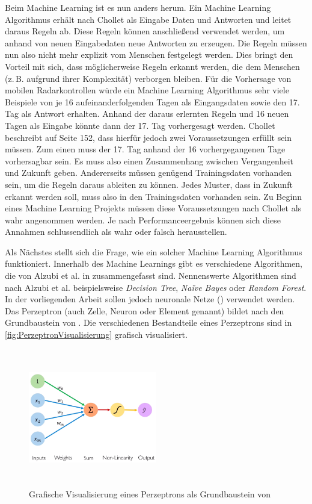 Beim Machine Learning ist es nun anders herum.
Ein Machine Learning Algorithmus erhält nach Chollet als Eingabe Daten und Antworten und leitet daraus Regeln ab.
Diese Regeln können anschließend verwendet werden, um anhand von neuen Eingabedaten neue Antworten zu erzeugen.
Die Regeln müssen nun also nicht mehr explizit vom Menschen festgelegt werden.
Dies bringt den Vorteil mit sich, dass möglicherweise Regeln erkannt werden, die dem Menschen (z.\,B. aufgrund ihrer Komplexität) verborgen bleiben.
Für die Vorhersage von mobilen Radarkontrollen würde ein Machine Learning Algorithmus sehr viele Beispiele von je 16 aufeinanderfolgenden Tagen als Eingangsdaten sowie den 17. Tag als Antwort erhalten.
Anhand der daraus erlernten Regeln und 16 neuen Tagen als Eingabe könnte dann der 17. Tag vorhergesagt werden.
Chollet beschreibt auf Seite 152, dass hierfür jedoch zwei Voraussetzungen erfüllt sein müssen.
Zum einen muss der 17. Tag anhand der 16 vorhergegangenen Tage vorhersagbar sein.
Es muss also einen Zusammenhang zwischen Vergangenheit und Zukunft geben.
Andererseits müssen genügend Trainingsdaten vorhanden sein, um die Regeln daraus ableiten zu können.
Jedes Muster, dass in Zukunft erkannt werden soll, muss also in den Trainingsdaten vorhanden sein.
Zu Beginn eines Machine Learning Projekts müssen diese Voraussetzungen nach Chollet als wahr angenommen werden.
Je nach Performanceergebnis können sich diese Annahmen schlussendlich als wahr oder falsch herausstellen.

Als Nächstes stellt sich die Frage, wie ein solcher Machine Learning Algorithmus funktioniert.
Innerhalb des Machine Learnings gibt es verschiedene Algorithmen, die von Alzubi et al. in \cite{MachineLearningOverview} zusammengefasst sind.
Nennenswerte Algorithmen sind nach Alzubi et al. beispielsweise \emph{Decision Tree}, \emph{Na\"ive Bayes} oder \emph{Random Forest}.
In der vorliegenden Arbeit sollen jedoch neuronale Netze () verwendet werden.
Das Perzeptron (auch Zelle, Neuron oder Element genannt) bildet nach \cite{6S191Intro} den Grundbaustein von .
Die verschiedenen Bestandteile eines Perzeptrons sind in \autoref{fig:PerzeptronVisualisierung} grafisch visualisiert.

\begin{figure}[h]
    \centering
    \includegraphics[width=0.5\textwidth,height=6cm,keepaspectratio=true]{content/images/PerzeptronVisualisierung.png}
    \caption{Grafische Visualisierung eines Perzeptrons als Grundbaustein von  \cite{6S191Intro}}
    \label{fig:PerzeptronVisualisierung}
\end{figure}

